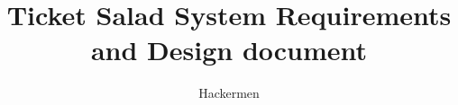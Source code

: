 \documentclass[11pt]{article}
\begin{document}
	\title{Ticket Salad System Requirements and Design document}
	\author{Hackermen}
	\date{}
	\maketitle
	\newpage
	\tableofcontents
	\newpage
	
\end{document}
